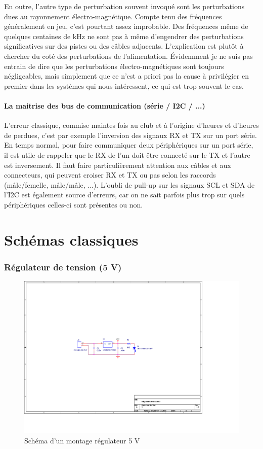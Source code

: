 \documentclass[a4paper]{article}
\begin{document}
En outre, l'autre type de perturbation souvent invoqué sont les perturbations dues au rayonnement électro-magnétique. Compte tenu des fréquences généralement en jeu, c'est pourtant assez improbable. Des fréquences même de quelques centaines de kHz ne sont pas à même d'engendrer des perturbations significatives sur des pistes ou des câbles adjacents. L'explication est plutôt à chercher du coté des perturbations de l'alimentation. Évidemment je ne suis pas entrain de dire que les perturbations électro-magnétiques sont toujours négligeables, mais simplement que ce n'est a priori pas la cause à privilégier en premier dans les systèmes qui nous intéressent, ce qui est trop souvent le cas.

\subsection{La maitrise des bus de communication (série / I2C / ...)}

L'erreur classique, commise maintes fois au club et à l'origine d'heures et d'heures de perdues, c'est par exemple l'inversion des signaux RX et TX sur un port série. En temps normal, pour faire communiquer deux périphériques sur un port série, il est utile de rappeler que le RX de l'un doit être connecté sur le TX et l'autre est inversement. Il faut faire particulièrement attention aux câbles et aux connecteurs, qui peuvent croiser RX et TX ou pas selon les raccords (mâle/femelle, mâle/mâle, ...). L'oubli de pull-up sur les signaux SCL et SDA de l'I2C est également source d'erreurs, car on ne sait parfois plus trop sur quels périphériques celles-ci sont présentes ou non.

\newpage
\part{Schémas classiques}

\section{Régulateur de tension (5 V)}

\begin{figure}[H]
	\centering
	\includegraphics[scale=1.00]{Images/Montage_regulateur_5V}
	\caption{Schéma d'un montage régulateur 5 V
		\label{Montage_regulateur_5V}}
\end{figure}
\end{document}
